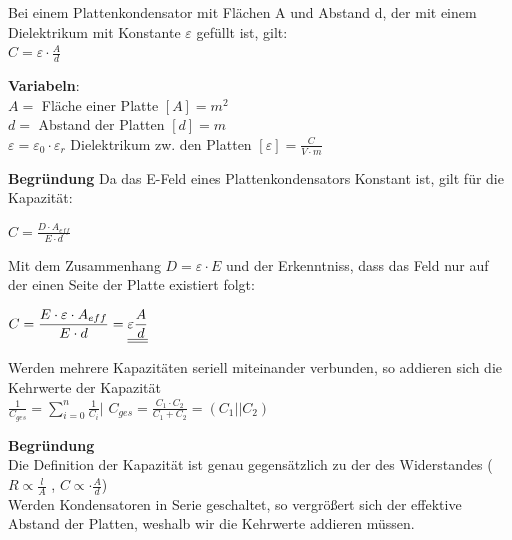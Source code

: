 \begingl
Bei einem Plattenkondensator mit Flächen A und Abstand d, der mit einem Dielektrikum mit Konstante $\varepsilon$ gefüllt ist, gilt: \\
\formulaBegin
$ \displaystyle C = \varepsilon \cdot \frac{A}{ d}$
\formulaEnd

\textbf{Variabeln}: \\
$A = $ Fläche einer Platte $ [A] = m^2 $ \\
$d = $ Abstand der Platten $ [d] = m$ \\
$ \varepsilon = \varepsilon_0 \cdot \varepsilon_r $ Dielektrikum zw. den Platten $ [\varepsilon] = \frac{C}{V\cdot m}$ \\

\iend

\textbf{Begründung}
Da das E-Feld eines Plattenkondensators Konstant ist, gilt für die Kapazität:
\fix
\fix
\begin{center}
	$ C= \displaystyle \frac{D \cdot A_{eff} } {E \cdot d} $
\end{center}
\fix
\fix
Mit dem Zusammenhang $ D = \varepsilon \cdot E$ und der Erkenntniss, dass das Feld nur auf der einen Seite der Platte existiert folgt:
\fix \fix
\begin{center}
	$ C= \displaystyle \frac{E \cdot \varepsilon \cdot A_{eff} } {E  \cdot d}  = \underline{\underline{\displaystyle \varepsilon \frac{A} { d}}}$
\end{center}




\beginip
Werden mehrere Kapazitäten seriell miteinander verbunden, so addieren sich die Kehrwerte der Kapazität \\
\formulaBegin
$\displaystyle \frac{1}{C_{ges}} = \sum_{i=0}^n \frac{1}{C_i} \Bigg\rvert$
$\displaystyle C_{ges} = \frac{C_1 \cdot C_2}{C_1 + C_2} = (C_1 || C_2)$
\formulaEnd
\iend


\textbf{Begründung} \\
Die Definition der Kapazität ist genau gegensätzlich zu der des Widerstandes ($ R \propto \frac{l}{A}$ , $ C \propto \cdot \frac{A}{d} $)\\
Werden Kondensatoren in Serie geschaltet, so vergrößert sich der effektive Abstand der Platten, weshalb wir die Kehrwerte addieren müssen. \\




